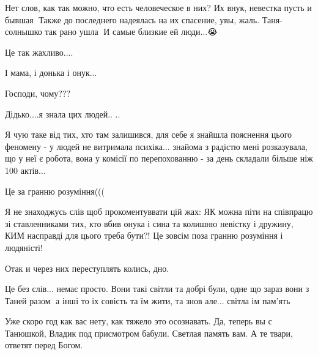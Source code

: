\begin{itemize}

Нет слов, как так можно, что есть человеческое в них? Их внук, невестка пусть и
бывшая🥀 Также до последнего надеялась на их спасение, увы, жаль. Таня-солнышко
так рано ушла🥀 И самые близкие ей люди...😭🥀🥀


Це так жахливо....

І мама, і донька і онук...

Господи, чому???


Дідько....я знала цих людей..
..


Я чую таке від тих, хто там залишився, для себе я знайшла пояснення цього
феномену - у людей не витримала психіка... знайома з радістю мені розказувала,
що у неї є робота, вона у комісії по перепохованню - за день складали більше
ніж 100 актів...


Це за гранню розуміння(((


Я не знаходжусь слів щоб прокоментуввати цій жах: ЯК можна піти на співпрацю зі
ставленниками тих, кто вбив онука і сина та колишню невістку і дружину, КИМ
насправді для цього треба бути?! Це зовсім поза гранню розуміння і людяністі!


Отак и через них переступлять колись, дно.


Це без слів... немає просто. Вони такі світли та добрі були, одне що зараз вони
з Таней разом🙏 а інші то іх совість та їм жити, та знов але... світла ім
пам'ять🙏


Уже скоро год как вас нету, как тяжело это осознавать. Да, теперь вы с Танюшкой,
Владик под присмотром бабули. Светлая память вам. А те твари, ответят перед
Богом.



\end{itemize} %
